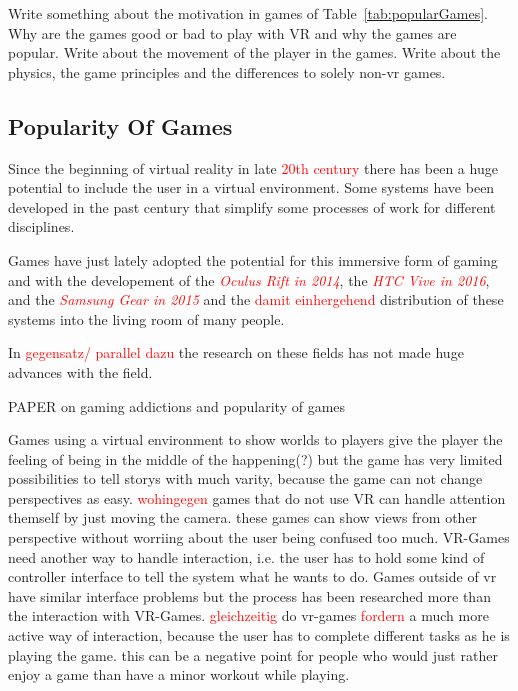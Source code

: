 

Write something about the motivation in games of Table~\ref{tab:popularGames}. Why are the games good or bad to play with VR and why the games are popular. Write about the movement of the player in the games. Write about the physics, the game principles and the differences to solely non-vr games.

\subsection{Popularity Of Games}
Since the beginning of virtual reality in late \textcolor{red}{20th century} there has been a huge potential to include the user in a virtual environment. Some systems have been developed in the past century that simplify some processes of work for different disciplines. 

Games have just lately adopted the potential for this immersive form of gaming and with the developement of the \textcolor{red}{\textit{Oculus Rift in 2014}}, the \textcolor{red}{\textit{HTC Vive in 2016}}, and the \textcolor{red}{\textit{Samsung Gear in 2015}} and the \textcolor{red}{damit einhergehend} distribution of these systems into the living room of many people.

In \textcolor{red}{gegensatz/ parallel dazu} the research on these fields has not made huge advances with the field.

PAPER on gaming addictions and popularity of games

Games using a virtual environment to show worlds to players give the player the feeling of being in the middle of the happening(?) but the game has very limited possibilities to tell storys with much varity, because the game can not change perspectives as easy. \textcolor{red}{wohingegen} games that do not use VR can handle attention themself by just moving the camera. these games can show views from other perspective without worriing about the user being confused too much. VR-Games need another way to handle interaction, i.e. the user has to hold some kind of controller interface to tell the system what he wants to do. Games outside of vr have similar interface problems but the process has been researched more than the interaction with VR-Games. \textcolor{red}{gleichzeitig} do vr-games \textcolor{red}{fordern} a much more active way of interaction, because the user has to complete different tasks as he is playing the game. this can be a negative point for people who would just rather enjoy a game than have a minor workout while playing.
			
